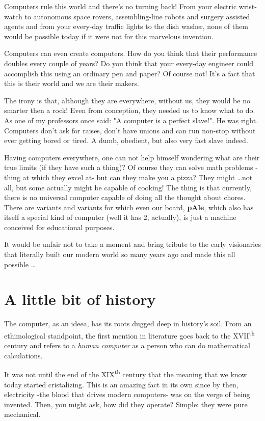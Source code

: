 \documentclass[12pt, a4paper]{book}
\begin{document}
Computers rule this world and there's no turning back! From your electric wrist-watch to autonomous space rovers, assembling-line robots and surgery assisted agents and from your every-day traffic lights to the dish washer, none of them would be possible today if it were not for this marvelous invention.

Computers can even create computers. How do you think that their performance doubles every couple of years? Do you think that your every-day engineer could accomplish this using an ordinary pen and paper? Of course not! It's a fact that this is their world and we are their makers.

The irony is that, although they are everywhere, without us, they would be no smarter then a rock! Even from conception, they needed us to know what to do. As one of my professors once said: "A computer is a perfect slave!". He was right. Computers don't ask for raises, don't have unions and can run non-stop  without ever getting bored or tired. A dumb, obedient, but also very fast slave indeed.

Having computers everywhere, one can not help himself wondering what are their true limits (if they have such a thing)? Of course they can solve math problems -thing at which they excel at- but can they make you a pizza? They might \ldots not all, but some actually might be capable of cooking! The thing is that currently, there is no universal computer capable of doing all the thought about chores. There are variants and variants for which even our board, \textbf{pAle}, which also has itself a special kind of computer (well it has 2, actually), is just a machine conceived for educational purposes.

It would be unfair not to take a moment and bring tribute to the early visionaries that literally built our modern world so many years ago and made this all possible \ldots

\section{A little bit of history}

The computer, as an ideea, has its roots dugged deep in history's soil. From an ethimological standpoint, the first mention in literature goes back to the \textsc{XVII}\textsuperscript{th} century and refers to a \textit{human computer} as a person who can do mathematical calculations. 

It was not until the end of the \textsc{XIX}\textsuperscript{th} century that the meaning that we know today started cristalizing. This is an amazing fact in its own since by then, electricity -the blood that drives modern computers- was on the verge of being invented. Then, you might ask, how did they operate? Simple: they were pure mechanical.
\end{document}
